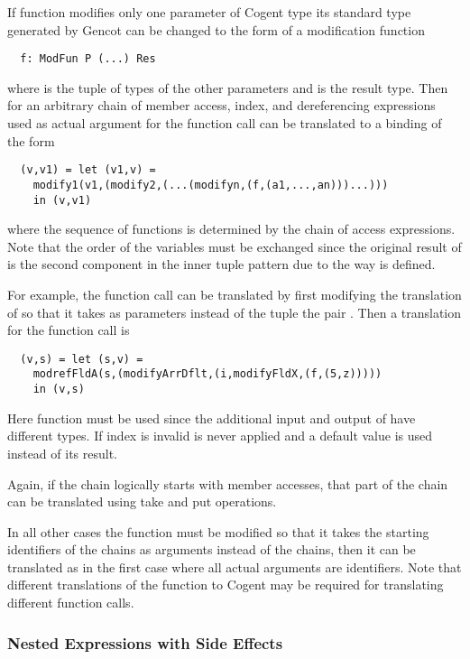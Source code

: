 If function  modifies only one parameter  of Cogent type  its standard type generated by
Gencot can be changed to the form of a modification function
\begin{verbatim}
  f: ModFun P (...) Res
\end{verbatim}
where  is the tuple of types of the other parameters and  is the result type. Then for an arbitrary
chain of member access, index, and dereferencing expressions used as actual argument for  the function call 
can be translated to a binding of the form
\begin{verbatim}
  (v,v1) = let (v1,v) = 
    modify1(v1,(modify2,(...(modifyn,(f,(a1,...,an)))...)))
    in (v,v1)
\end{verbatim}
where the sequence of  functions is determined by the chain of access expressions. Note
that the order of the variables must be exchanged since the original result of  is the second component in 
the inner tuple pattern due to the way  is defined.

For example, the function call  can be translated by first modifying the translation of 
 so that it takes as parameters instead of the tuple  the pair . Then a translation
for the function call is
\begin{verbatim}
  (v,s) = let (s,v) = 
    modrefFldA(s,(modifyArrDflt,(i,modifyFldX,(f,(5,z)))))
    in (v,s)
\end{verbatim}
Here function  must be used since the additional input and output of  have different types.
If index  is invalid  is never applied and a default value is used instead of its result.

Again, if the chain logically starts with member accesses, that part of the chain can be translated using take and put operations.

In all other cases the function  must be modified so that it takes the starting identifiers of the chains as
arguments instead of the chains, then it can be translated as in the first case where all actual arguments are identifiers.
Note that different translations of the function to Cogent may be required for translating different function calls.

\subsubsection{Nested Expressions with Side Effects}


